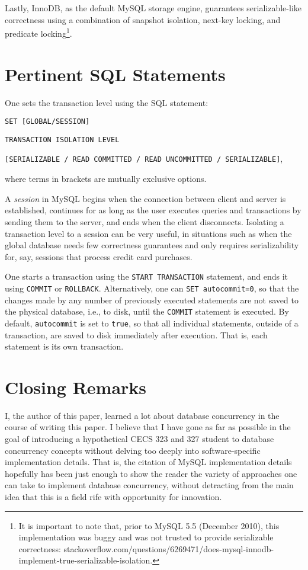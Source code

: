 \documentclass[12pt]{article} %
\begin{document}
Lastly, InnoDB, as the default MySQL storage engine, guarantees serializable-like correctness using a combination of snapshot isolation, next-key locking, and predicate locking\footnote{It is important to note that, prior to MySQL 5.5 (December 2010), this implementation was buggy and was not trusted to provide serializable correctness: stackoverflow.com/questions/6269471/does-mysql-innodb-implement-true-serializable-isolation.}.

\section{Pertinent SQL Statements}
One sets the transaction level using the SQL statement:

\small{\texttt{SET [GLOBAL/SESSION] }

\texttt{TRANSACTION ISOLATION LEVEL} 

\texttt{[SERIALIZABLE / READ COMMITTED / READ UNCOMMITTED / SERIALIZABLE]}, 

where terms in brackets are mutually exclusive options. 

A \textsl{session} in MySQL begins when the connection between client and server is established, continues for as long as the user executes queries and transactions by sending them to the server, and ends when the client disconnects. Isolating a transaction level to a session can be very useful, in situations such as when the global database needs few correctness guarantees and only requires serializability for, say, sessions that process credit card purchases.

One starts a transaction using the \texttt{START TRANSACTION} statement, and ends it using \texttt{COMMIT} or \texttt{ROLLBACK}. Alternatively, one can \texttt{SET autocommit=0}, so that the changes made by any number of previously executed statements are not saved to the physical database, i.e., to disk, until the \texttt{COMMIT} statement is executed. By default, \texttt{autocommit} is set to \texttt{true}, so that all individual statements, outside of a transaction, are saved to disk immediately after execution. That is, each statement is its own transaction.

\section{Closing Remarks} %
I, the author of this paper, learned a lot about database concurrency in the course of writing this paper. I believe that I have gone as far as possible in the goal of introducing a hypothetical CECS 323 and 327 student to database concurrency concepts without delving too deeply into software-specific implementation details. That is, the citation of MySQL implementation details hopefully has been just enough to show the reader the variety of approaches one can take to implement database concurrency, without detracting from the main idea that this is a field rife with opportunity for innovation.%

}
\end{document}
